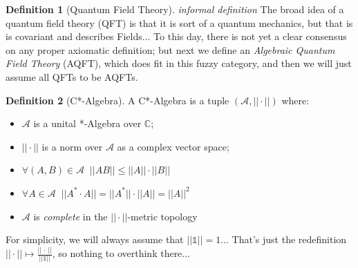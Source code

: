 \documentclass[a4paper,11pt]{article}
\numberwithin{equation}{section}
\theoremstyle{definition}
\newtheorem{definition}{Definition}
\newtheorem{comment}{Comment}
\begin{document}
\begin{definition}[Quantum Field Theory] \emph{informal definition}
    The broad idea of a quantum field theory (QFT) is that it is sort of a quantum mechanics, but that is is covariant and describes Fields...
    To this day, there is not yet a clear consensus on any proper axiomatic definition; but next we define an \emph{Algebraic Quantum Field Theory} (AQFT), which does fit in this fuzzy category, and then we will just assume all QFTs to be AQFTs.
\end{definition}
\begin{definition}[C*-Algebra]
    A C*-Algebra is a tuple $(\mathcal{A}, ||\cdot||)$ where:
    \begin{itemize}
        \item $\mathcal{A}$ is a unital *-Algebra over $\mathbb{C}$;
        \item $||\cdot||$ is a norm over $\mathcal{A}$ as a complex vector space;
        \item $\forall (A,B)\in\mathcal{A}\;\; ||AB||\leq||A||\cdot||B||$
        \item $\forall A\in\mathcal{A}\;\; ||A^*\cdot A||=||A^*||\cdot||A||=||A||^2$
        \item $\mathcal{A}$ is \emph{complete} in the $||\cdot||$-metric topology
    \end{itemize} 
For simplicity, we will always assume that $||\mathds{1}||=1$... That's just the redefinition $||\cdot||\mapsto\frac{||\,\cdot\,||}{||\mathds{1}||}$, so nothing to overthink there...
\end{definition}

\end{document}
